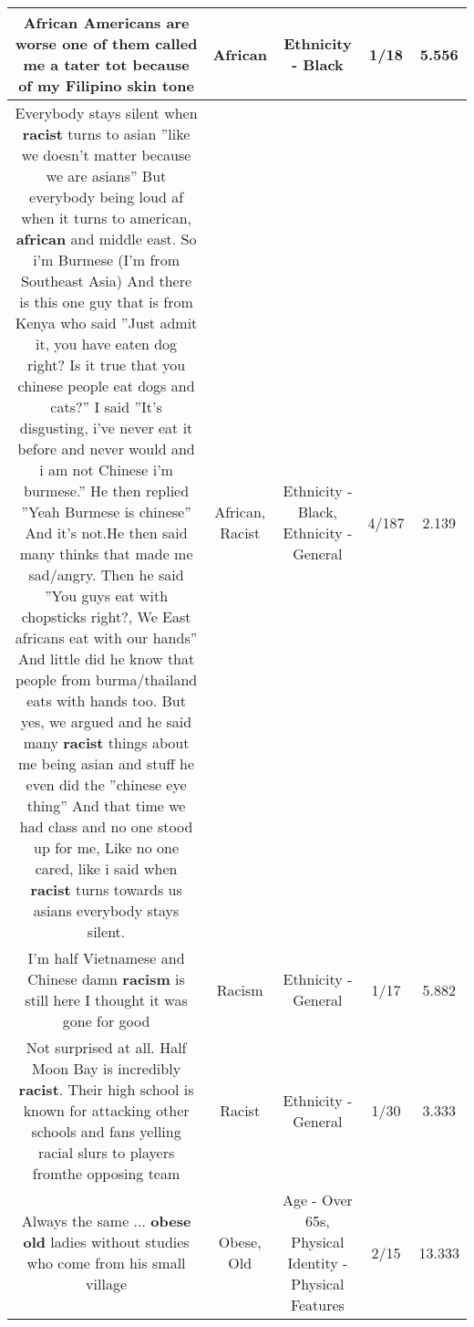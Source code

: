 \documentclass[11pt]{article}
\newlength\mylength
\begin{document}
\begin{center}
\begin{longtable}{|C{.65\mylength}|C{.30\mylength}|C{.12\mylength}|C{.12\mylength}|C{.12\mylength}|}
  \small African Americans are worse one of them called me a tater tot because of my Filipino skin tone\normalsize   & African & Ethnicity - Black & 1/18 & 5.556 \\  \hline
  \small Everybody stays silent when \textbf{racist} turns to asian ''like we doesn't matter because we are asians'' But everybody being loud af when it turns to american, \textbf{african} and middle east. So i'm Burmese (I'm from Southeast Asia) And there is this one guy that is from Kenya who said ''Just admit it, you have eaten dog right? Is it true that you chinese people eat dogs and cats?'' I said ''It's disgusting, i've never eat it before and never would and i am not Chinese i'm burmese.'' He then replied ''Yeah Burmese is chinese'' And it's not.He then said many thinks that made me sad/angry. Then he said ''You guys eat with chopsticks right?, We East africans eat with our hands'' And little did he know that people from burma/thailand eats with hands too. But yes, we argued and he said many \textbf{racist} things about me being asian and stuff he even did the ''chinese eye thing'' And that time we had class and no one stood up for me, Like no one cared, like i said when \textbf{racist} turns towards us asians everybody stays silent.\normalsize   & African, Racist & Ethnicity - Black, Ethnicity - General & 4/187 & 2.139 \\  \hline
  \small I'm half Vietnamese and Chinese damn \textbf{racism} is still here I thought it was gone for good\normalsize   & Racism & Ethnicity - General & 1/17 & 5.882 \\  \hline
  \small Not surprised at all. Half Moon Bay is incredibly \textbf{racist}. Their high school is known for attacking other schools and fans yelling racial slurs to players fromthe opposing team\normalsize   & Racist & Ethnicity - General & 1/30 & 3.333 \\  \hline
  \small Always the same ... \textbf{obese} \textbf{old} ladies without studies who come from his small village\normalsize   & Obese, Old & Age - Over 65s, Physical Identity - Physical Features & 2/15 & 13.333 \\  \hline

\end{longtable}
\end{center}
\end{document}
